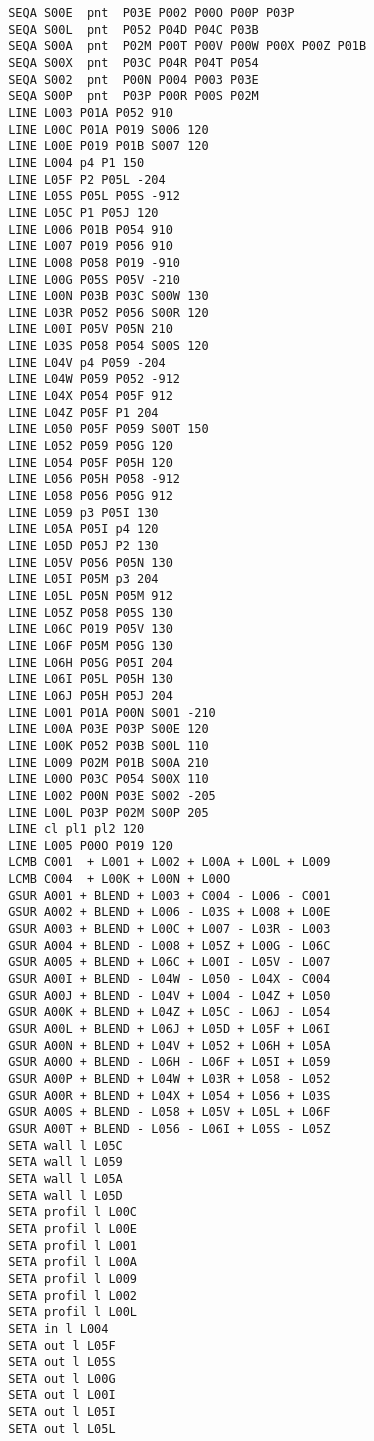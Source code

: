 \documentclass{article}
\begin{document}
\begin{appendix}
\begin{verbatim}
 SEQA S00E  pnt  P03E P002 P00O P00P P03P
 SEQA S00L  pnt  P052 P04D P04C P03B
 SEQA S00A  pnt  P02M P00T P00V P00W P00X P00Z P01B
 SEQA S00X  pnt  P03C P04R P04T P054
 SEQA S002  pnt  P00N P004 P003 P03E
 SEQA S00P  pnt  P03P P00R P00S P02M
 LINE L003 P01A P052 910
 LINE L00C P01A P019 S006 120
 LINE L00E P019 P01B S007 120
 LINE L004 p4 P1 150
 LINE L05F P2 P05L -204
 LINE L05S P05L P05S -912
 LINE L05C P1 P05J 120
 LINE L006 P01B P054 910
 LINE L007 P019 P056 910
 LINE L008 P058 P019 -910
 LINE L00G P05S P05V -210
 LINE L00N P03B P03C S00W 130
 LINE L03R P052 P056 S00R 120
 LINE L00I P05V P05N 210
 LINE L03S P058 P054 S00S 120
 LINE L04V p4 P059 -204
 LINE L04W P059 P052 -912
 LINE L04X P054 P05F 912
 LINE L04Z P05F P1 204
 LINE L050 P05F P059 S00T 150
 LINE L052 P059 P05G 120
 LINE L054 P05F P05H 120
 LINE L056 P05H P058 -912
 LINE L058 P056 P05G 912
 LINE L059 p3 P05I 130
 LINE L05A P05I p4 120
 LINE L05D P05J P2 130
 LINE L05V P056 P05N 130
 LINE L05I P05M p3 204
 LINE L05L P05N P05M 912
 LINE L05Z P058 P05S 130
 LINE L06C P019 P05V 130
 LINE L06F P05M P05G 130
 LINE L06H P05G P05I 204
 LINE L06I P05L P05H 130
 LINE L06J P05H P05J 204
 LINE L001 P01A P00N S001 -210
 LINE L00A P03E P03P S00E 120
 LINE L00K P052 P03B S00L 110
 LINE L009 P02M P01B S00A 210
 LINE L00O P03C P054 S00X 110
 LINE L002 P00N P03E S002 -205
 LINE L00L P03P P02M S00P 205
 LINE cl pl1 pl2 120
 LINE L005 P00O P019 120
 LCMB C001  + L001 + L002 + L00A + L00L + L009 
 LCMB C004  + L00K + L00N + L00O 
 GSUR A001 + BLEND + L003 + C004 - L006 - C001 
 GSUR A002 + BLEND + L006 - L03S + L008 + L00E 
 GSUR A003 + BLEND + L00C + L007 - L03R - L003 
 GSUR A004 + BLEND - L008 + L05Z + L00G - L06C 
 GSUR A005 + BLEND + L06C + L00I - L05V - L007 
 GSUR A00I + BLEND - L04W - L050 - L04X - C004 
 GSUR A00J + BLEND - L04V + L004 - L04Z + L050 
 GSUR A00K + BLEND + L04Z + L05C - L06J - L054 
 GSUR A00L + BLEND + L06J + L05D + L05F + L06I 
 GSUR A00N + BLEND + L04V + L052 + L06H + L05A 
 GSUR A00O + BLEND - L06H - L06F + L05I + L059 
 GSUR A00P + BLEND + L04W + L03R + L058 - L052 
 GSUR A00R + BLEND + L04X + L054 + L056 + L03S 
 GSUR A00S + BLEND - L058 + L05V + L05L + L06F 
 GSUR A00T + BLEND - L056 - L06I + L05S - L05Z 
 SETA wall l L05C 
 SETA wall l L059 
 SETA wall l L05A 
 SETA wall l L05D 
 SETA profil l L00C 
 SETA profil l L00E 
 SETA profil l L001 
 SETA profil l L00A 
 SETA profil l L009 
 SETA profil l L002 
 SETA profil l L00L 
 SETA in l L004 
 SETA out l L05F 
 SETA out l L05S 
 SETA out l L00G 
 SETA out l L00I 
 SETA out l L05I 
 SETA out l L05L 
\end{verbatim}



\end{appendix}
\end{document}
